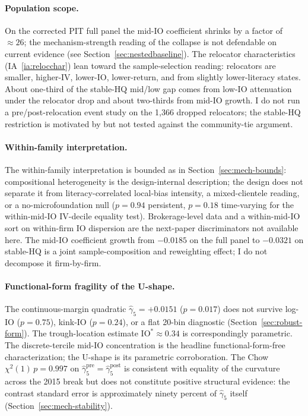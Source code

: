 \paragraph{Population scope.} On the corrected PIT full panel the mid-IO coefficient shrinks by a factor of $\approx 26$; the mechanism-strength reading of the collapse is not defendable on current evidence (see Section~\ref{sec:nestedbaseline}). The relocator characteristics (IA~\ref{ia:relocchar}) lean toward the sample-selection reading: relocators are smaller, higher-IV, lower-IO, lower-return, and from slightly lower-literacy states. About one-third of the stable-HQ mid/low gap comes from low-IO attenuation under the relocator drop and about two-thirds from mid-IO growth. I do not run a pre/post-relocation event study on the 1,366 dropped relocators; the stable-HQ restriction is motivated by but not tested against the community-tie argument.

\paragraph{Within-family interpretation.} The within-family interpretation is bounded as in Section~\ref{sec:mech-bounds}: compositional heterogeneity is the design-internal description; the design does not separate it from literacy-correlated local-bias intensity, a mixed-clientele reading, or a no-microfoundation null ($p = 0.94$ persistent, $p = 0.18$ time-varying for the within-mid-IO IV-decile equality test). Brokerage-level data and a within-mid-IO sort on within-firm IO dispersion are the next-paper discriminators not available here. The mid-IO coefficient growth from $-0.0185$ on the full panel to $-0.0321$ on stable-HQ is a joint sample-composition and reweighting effect; I do not decompose it firm-by-firm.

\paragraph{Functional-form fragility of the U-shape.} The continuous-margin quadratic $\hat\gamma_{5} = +0.0151$ ($p = 0.017$) does not survive log-IO ($p = 0.75$), kink-IO ($p = 0.24$), or a flat 20-bin diagnostic (Section~\ref{sec:robust-form}). The trough-location estimate $\mathrm{IO}^{\ast} \approx 0.34$ is correspondingly parametric. The discrete-tercile mid-IO concentration is the headline functional-form-free characterization; the U-shape is its parametric corroboration. The Chow $\chi^{2}(1)\,p = 0.997$ on $\hat\gamma_{5}^{\text{pre}} = \hat\gamma_{5}^{\text{post}}$ is consistent with equality of the curvature across the 2015 break but does not constitute positive structural evidence: the contrast standard error is approximately ninety percent of $\hat\gamma_{5}$ itself (Section~\ref{sec:mech-stability}).

